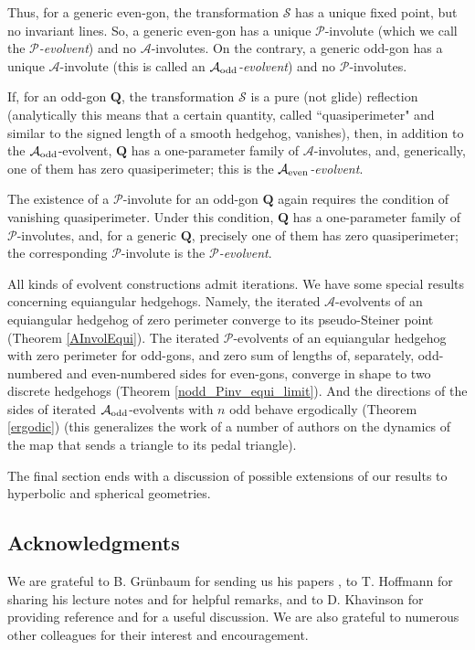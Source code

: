\documentclass[12pt]{article}
\newcommand{\Pev}{\mathcal{P}}
\newcommand{\Aev}{\mathcal{A}}
\begin{document}
Thus, for a generic even-gon, the transformation $\mathcal S$ has a unique fixed point, but no invariant lines. So, a generic even-gon has a unique $\Pev$-involute (which we call the {\it $\Pev$-evolvent}) and no $\Aev$-involutes. On the contrary, a generic odd-gon has a unique $\Aev$-involute (this is called an {\it $\Aev_{\rm odd}$-evolvent}) and no $\Pev$-involutes. 

If, for an odd-gon $\mathbf Q$, the transformation $\mathcal S$ is a pure (not glide) reflection (analytically this means that a certain quantity, called ``quasiperimeter" and similar to the signed length of a smooth hedgehog, vanishes), then, in addition to the $\Aev_{\rm odd}$-evolvent, $\mathbf Q$ has a one-parameter family of $\Aev$-involutes, and, generically, one of them has zero quasiperimeter; this is the {\it $\Aev_{\rm even}$-evolvent}. 

The existence of a $\Pev$-involute for an odd-gon $\mathbf Q$ again requires the condition of vanishing quasiperimeter. Under this condition, $\mathbf Q$ has a one-parameter family of $\Pev$-involutes, and, for a generic $\mathbf Q$, precisely one of them has zero quasiperimeter; the corresponding $\Pev$-involute is the {\it $\Pev$-evolvent}. 

All kinds of evolvent constructions admit iterations. We have some special results concerning equiangular hedgehogs. Namely, the iterated $\Aev$-evolvents of an equiangular hedgehog of zero perimeter converge to its pseudo-Steiner point (Theorem \ref{AInvolEqui}). 
The iterated $\Pev$-evolvents of an equiangular hedgehog with zero perimeter for odd-gons, and zero sum of lengths of, separately, odd-numbered and even-numbered sides for even-gons, converge in shape to two discrete hedgehogs (Theorem \ref{nodd_Pinv_equi_limit}).
And the directions of the sides of iterated $\Aev_{\rm odd}$-evolvents with $n$ odd behave ergodically (Theorem \ref{ergodic}) (this generalizes the work of a number of authors on the dynamics of the map that sends a triangle to its pedal triangle).

The final section ends with a discussion of possible extensions of our results to hyperbolic and spherical geometries.


\subsection{Acknowledgments} We are grateful to B. Gr\"unbaum for 
sending us his papers \cite{Gr1,Gr2}, to T. Hoffmann for sharing his lecture notes  \cite{Ho} and for helpful remarks, and to D. Khavinson for providing reference \cite{PW} and for a useful discussion. We are also grateful to numerous other colleagues for their interest and encouragement.
\end{document}

